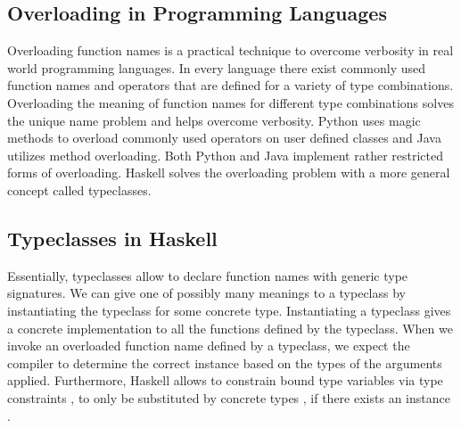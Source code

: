 \subsection{Overloading in Programming Languages}
Overloading function names is a practical technique to overcome verbosity in real world programming languages. 
In every language there exist commonly used function names and operators that are defined for a variety of type combinations.
Overloading the meaning of function names for different type combinations solves the unique name problem and helps overcome verbosity.
Python uses magic methods to overload commonly used operators on user defined classes and Java utilizes method overloading. Both Python and Java implement rather restricted forms of overloading. Haskell solves the overloading problem with a more general concept called typeclasses.

\subsection{Typeclasses in Haskell}
Essentially, typeclasses allow to declare function names with generic type signatures.
We can give one of possibly many meanings to a typeclass by instantiating the typeclass for some concrete type. Instantiating a typeclass gives a concrete implementation to all the functions defined by the typeclass.
When we invoke an overloaded function name defined by a typeclass, we expect the compiler to determine the correct instance based on the types of the arguments applied. 
Furthermore, Haskell allows to constrain bound type variables  via type constraints , to only be substituted by concrete types , if there exists an instance  .

